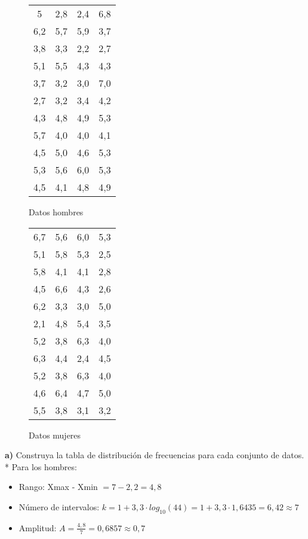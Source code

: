 \documentclass{templateNote}
\begin{document}
\begin{figure}[H]
    \centering
    \begin{minipage}{.45\textwidth}
        \centering
        \begin{tabular}{|c|c|c|c|}
            \hline
            5 & 2,8 & 2,4 & 6,8 \\
            6,2	& 5,7 & 5,9 & 3,7 \\
            3,8 & 3,3 & 2,2 & 2,7 \\
            5,1 & 5,5 & 4,3 & 4,3 \\
            3,7	& 3,2 & 3,0	& 7,0 \\
            2,7 & 3,2 & 3,4 & 4,2 \\
            4,3 & 4,8 & 4,9 & 5,3 \\
            5,7 & 4,0 & 4,0 & 4,1 \\
            4,5 & 5,0 & 4,6 & 5,3 \\
            5,3 & 5,6 & 6,0 & 5,3 \\
            4,5 & 4,1 & 4,8 & 4,9 \\
            \hline 
        \end{tabular}
        \caption{Datos hombres}
    \end{minipage}\hfill
    \begin{minipage}{.45\textwidth}
        \centering
        \begin{tabular}{|c|c|c|c|}
            \hline
            6,7&5,6&6,0&5,3\\
            5,1&5,8&5,3&2,5\\
            5,8&4,1&4,1&2,8\\
            4,5&6,6&4,3&2,6\\
            6,2&3,3&3,0&5,0\\
            2,1&4,8&5,4&3,5\\
            5,2&3,8&6,3&4,0\\
            6,3&4,4&2,4&4,5\\
            5,2&3,8&6,3&4,0\\
            4,6&6,4&4,7&5,0\\
            5,5&3,8&3,1&3,2\\
            \hline 
        \end{tabular}
        \caption{Datos mujeres}
    \end{minipage}
\end{figure}

\textbf{a)} Construya la tabla de distribución de frecuencias para cada conjunto de datos. 
* Para los hombres:
\begin{itemize}
    \item Rango: Xmax - Xmin $ = 7 - 2,2 = 4,8$
    
    \item Número de intervalos: $k = 1 + 3,3 \cdot log_{10}(44) = 1 + 3,3 \cdot 1,6435 = 6,42 \approx 7$
    
    \item Amplitud: $A = \frac{4,8}{7} = 0,6857 \approx 0,7$
\end{itemize}
\end{document}
